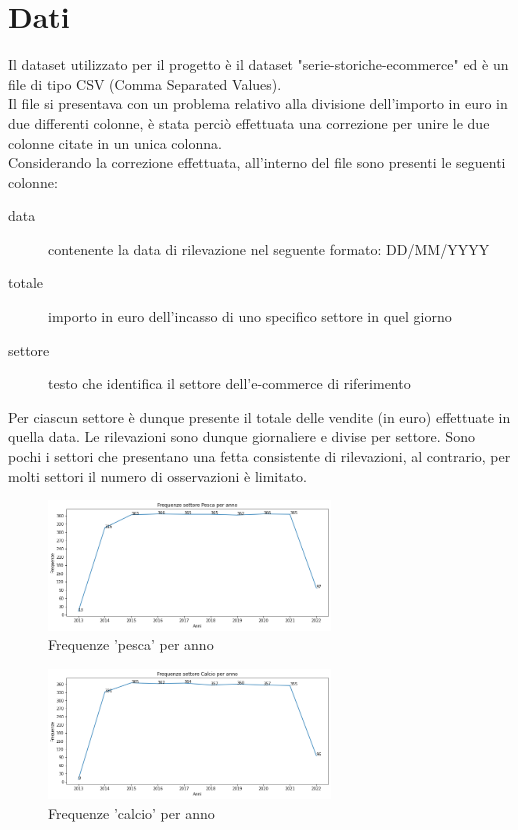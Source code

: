 \documentclass[12pt, a4paper, twocolumn]{article} %
\begin{document}
\section{Dati}
Il dataset utilizzato per il progetto è il dataset "serie-storiche-ecommerce" ed è un file di tipo CSV (Comma Separated Values).\\
Il file si presentava con un problema relativo alla divisione dell'importo in euro in due differenti colonne, è stata perciò effettuata una correzione per unire le due colonne citate in un unica colonna.\\
Considerando la correzione effettuata, all'interno del file sono presenti le seguenti colonne:
\begin{description}
	\item[data] contenente la data di rilevazione nel seguente formato: DD/MM/YYYY
	\item[totale] importo in euro dell'incasso di uno specifico settore in quel giorno
	\item[settore] testo che identifica il settore dell'e-commerce di riferimento
\end{description}
Per ciascun settore è dunque presente il totale delle vendite (in euro) effettuate in quella data. Le rilevazioni sono dunque giornaliere e divise per settore. Sono pochi i settori che presentano una fetta consistente di rilevazioni, al contrario, per molti settori il numero di osservazioni è limitato.\\
\begin{figure}
  \caption{Frequenze 'pesca' per anno}
  \begin{center}
    \includegraphics[width=75mm,scale=0.5]{frequenze-pesca.png}
  \end{center}
\end{figure}
\begin{figure}
  \caption{Frequenze 'calcio' per anno}
  \begin{center}
    \includegraphics[width=75mm,scale=0.5]{frequenze-calcio.png}
  \end{center}
\end{figure}
\end{document}
